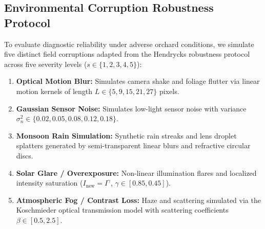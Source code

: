 \subsection{Environmental Corruption Robustness Protocol}
To evaluate diagnostic reliability under adverse orchard conditions, we simulate five distinct field corruptions adapted from the Hendrycks robustness protocol \cite{hendrycks2019benchmarking} across five severity levels ($s \in \{1, 2, 3, 4, 5\}$):
\begin{enumerate}
    \item \textbf{Optical Motion Blur:} Simulates camera shake and foliage flutter via linear motion kernels of length $L \in \{5, 9, 15, 21, 27\}$ pixels.
    \item \textbf{Gaussian Sensor Noise:} Simulates low-light sensor noise with variance $\sigma_n^2 \in \{0.02, 0.05, 0.08, 0.12, 0.18\}$.
    \item \textbf{Monsoon Rain Simulation:} Synthetic rain streaks and lens droplet splatters generated by semi-transparent linear blurs and refractive circular discs.
    \item \textbf{Solar Glare / Overexposure:} Non-linear illumination flares and localized intensity saturation ($I_{\text{new}} = I^\gamma$, $\gamma \in [0.85, 0.45]$).
    \item \textbf{Atmospheric Fog / Contrast Loss:} Haze and scattering simulated via the Koschmieder optical transmission model with scattering coefficients $\beta \in [0.5, 2.5]$.
\end{enumerate}
